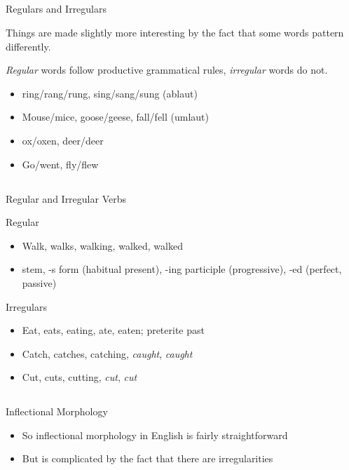 \documentclass[9pt,xcolor=pdftex,dvipsnames,table]{beamer}
\begin{document}
\subsection{}
\begin{frame}{Regulars and Irregulars}

	{\large Things are made slightly more interesting by the fact
		that some words pattern differently. }
	\vspace{.5cm}

	\emph{Regular} words follow productive grammatical rules, \emph{irregular} words do not.
	\begin{itemize}
		\item ring/rang/rung, sing/sang/sung (ablaut)
		\item Mouse/mice, goose/geese, fall/fell (umlaut)
		\item ox/oxen, deer/deer
		\item Go/went, fly/flew
	\end{itemize}
\end{frame}

\subsection{}
\begin{frame}{Regular and Irregular Verbs}

{\large Regular}
\vspace{.5cm}

\begin{itemize}
	\item Walk, walks, walking, walked, walked
	\item stem, -s form (habitual present), -ing participle (progressive), -ed (perfect, passive)
\end{itemize}

{\large Irregulars }
\vspace{.5cm}
\begin{itemize}
	\item Eat, eats, eating, ate, eaten; preterite past
	\item Catch, catches, catching, \emph{caught}, \emph{caught}
	\item Cut, cuts, cutting, \emph{cut}, \emph{cut}
\end{itemize}

\end{frame}

\subsection{}
\begin{frame}{Inflectional Morphology}
\begin{itemize}
	\item  So inflectional morphology in English is fairly straightforward
	\item  But is complicated by the fact that there are irregularities
\end{itemize}
\end{frame}
\end{document}
